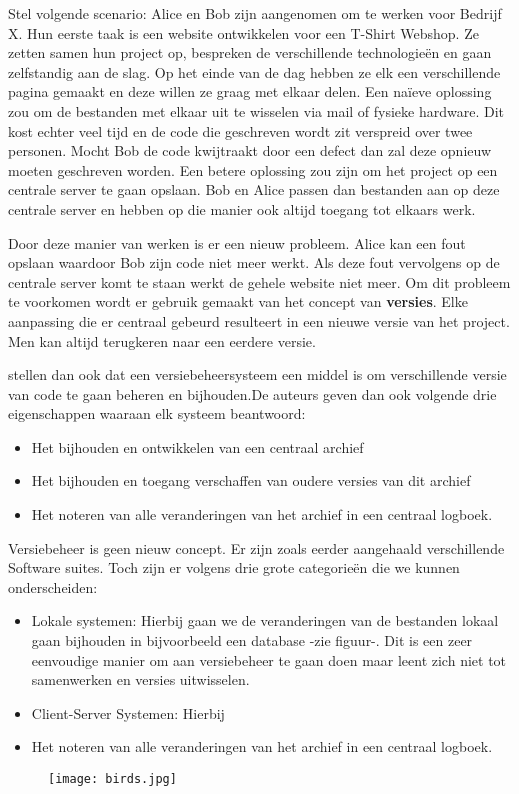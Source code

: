 Stel volgende scenario: Alice en Bob zijn aangenomen om te werken voor Bedrijf X. Hun eerste taak is een website ontwikkelen voor een T-Shirt Webshop. Ze zetten samen hun project op, bespreken de verschillende technologieën en gaan zelfstandig aan de slag. Op het einde van de dag hebben ze elk een verschillende pagina gemaakt en deze willen ze graag met elkaar delen. Een naïeve oplossing zou om de bestanden met elkaar uit te wisselen via mail of fysieke hardware. Dit kost echter veel tijd en de code die geschreven wordt zit verspreid over twee personen. Mocht Bob de code kwijtraakt door een defect dan zal deze opnieuw moeten geschreven worden. Een betere oplossing zou zijn om het project op een centrale server te gaan opslaan. Bob en Alice passen dan bestanden aan op deze centrale  server en hebben op die manier ook altijd toegang tot elkaars werk.

Door deze manier van werken is er een nieuw probleem. Alice kan een fout opslaan waardoor Bob zijn code niet meer werkt. Als deze fout vervolgens op de centrale server komt te staan werkt de gehele website niet meer. Om dit probleem te voorkomen wordt er gebruik gemaakt van het concept van \textbf{versies}. Elke aanpassing die er centraal gebeurd resulteert in een nieuwe versie van het project. Men kan altijd terugkeren naar een eerdere versie.

\textcite{Loeliger2009} stellen dan ook dat een versiebeheersysteem een middel is om verschillende versie van code te gaan beheren en bijhouden.De auteurs geven dan ook volgende drie eigenschappen waaraan elk systeem beantwoord:

\begin{itemize}
	\item Het bijhouden en ontwikkelen van een centraal archief
	\item Het bijhouden en toegang verschaffen van oudere versies van dit archief
	\item Het noteren van alle veranderingen van het archief in een centraal logboek.
\end{itemize}

Versiebeheer is geen nieuw concept. Er zijn zoals eerder aangehaald verschillende Software suites. Toch zijn er volgens \textcite{Chacon2014} drie grote categorieën die we kunnen onderscheiden:

\begin{itemize}
	\item Lokale systemen: Hierbij gaan we de veranderingen van de bestanden lokaal gaan bijhouden in bijvoorbeeld een database -zie figuur-. Dit is een zeer eenvoudige manier om aan versiebeheer te gaan doen maar leent zich niet tot samenwerken en versies uitwisselen.
	\item Client-Server Systemen: Hierbij 
	\item Het noteren van alle veranderingen van het archief in een centraal logboek.
\end{itemize}

\begin{figure}[h!]
  \texttt{[image: birds.jpg]}
\end{figure}

